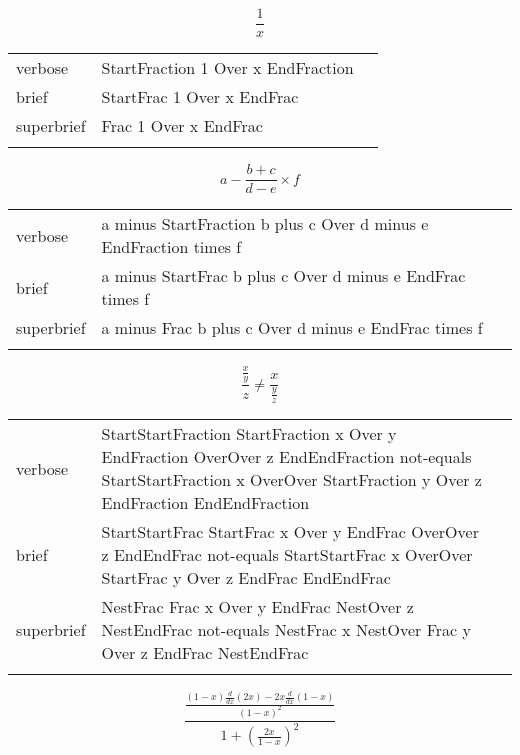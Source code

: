 
\label{sec:fractions}

\R
\E \[\frac{1}{x}\]
\begin{longtable}[c]{@{}lll@{}}
\toprule\addlinespace
verbose & StartFraction 1 Over x EndFraction &

\\\addlinespace
brief & StartFrac 1 Over x EndFrac &

\\\addlinespace
superbrief & Frac 1 Over x EndFrac &

\\\addlinespace
\bottomrule
\end{longtable}


\E \[a-\frac{b+c}{d-e}\times f\]
\begin{longtable}[c]{@{}lll@{}}
\toprule\addlinespace
verbose & a minus StartFraction b plus c Over d minus e EndFraction
times f &

\\\addlinespace
brief & a minus StartFrac b plus c Over d minus e EndFrac times f &

\\\addlinespace
superbrief & a minus Frac b plus c Over d minus e EndFrac times f &

\\\addlinespace
\bottomrule
\end{longtable}


\R
\E \[\frac{\frac{x}{y}}{z}\neq \frac{x}{\frac{y}{z}}\]
\begin{longtable}[c]{@{}lll@{}}
\toprule\addlinespace
verbose & StartStartFraction StartFraction x Over y EndFraction OverOver
z EndEndFraction not-equals StartStartFraction x OverOver StartFraction
y Over z EndFraction EndEndFraction &

\\\addlinespace
brief & StartStartFrac StartFrac x Over y EndFrac OverOver z EndEndFrac
not-equals StartStartFrac x OverOver StartFrac y Over z EndFrac
EndEndFrac &

\\\addlinespace
superbrief & NestFrac Frac x Over y EndFrac NestOver z NestEndFrac
not-equals NestFrac x NestOver Frac y Over z EndFrac NestEndFrac &

\\\addlinespace
\bottomrule
\end{longtable}


\R
\E \[\frac{\frac{\left(1-x\right)\frac{d}{dx}\left(2x\right)-2x\frac{d}{dx}\left(1-x\right)}{\left(1-x\right)^2}}{1+\left(\frac{2x}{1-x}\right)^2}\]

